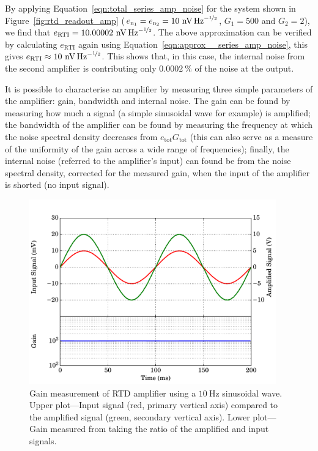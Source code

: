 \par 
By applying Equation~\ref{eqn:total_series_amp_noise} for the system shown in Figure~\ref{fig:rtd_readout_amp} ($e_{\mathrm{n_{1}}} = e_{\mathrm{n_{2}}} = 10~\mathrm{nV\,Hz}^{-\nicefrac{1}{2}}$, $G_{1} = 500$ and $G_{2} = 2$), we find that $e_{\mathrm{RTI}} = 10.00002~\mathrm{nV\,Hz}^{-\nicefrac{1}{2}}$. The above approximation can be verified by calculating $e_{\mathrm{RTI}}$ again using Equation~\ref{eqn:approx__series_amp_noise}, this gives $e_{\mathrm{RTI}} \approx 10~\mathrm{nV\,Hz}^{-\nicefrac{1}{2}}$\label{res:RTD_amp_noise}. This shows that, in this case, the internal noise from the second amplifier is contributing only $0.0002~\%$ of the  noise at the output.
\par 
It is possible to characterise an amplifier by measuring three simple parameters of the amplifier: gain, bandwidth and internal noise. The gain can be found by measuring how much a signal (a simple sinusoidal wave for example) is amplified; the bandwidth of the amplifier can be found by measuring the frequency at which the noise spectral density decreases from $e_{\mathrm{tot}}G_{\mathrm{tot}}$ (this can also serve as a measure of the uniformity of the gain across a wide range of frequencies); finally, the internal noise (referred to the amplifier's input) can found be from the noise spectral density, corrected for the measured gain, when the input of the amplifier is shorted (no input signal).
\par
\begin{figure}[t]
\begin{center}
\includegraphics[width = 0.95\textwidth]{figures/RTD_amp_gain}
\caption[Gain measurement of original amplifier]{Gain measurement of RTD amplifier using a $10~\mathrm{Hz}$ sinusoidal wave. Upper plot---Input signal (red, primary vertical axis) compared to the amplified signal (green, secondary vertical axis). Lower plot---Gain measured from taking the ratio of the amplified and input signals.}
\label{fig:RTD_amp_gain}
\end{center}
\end{figure}
